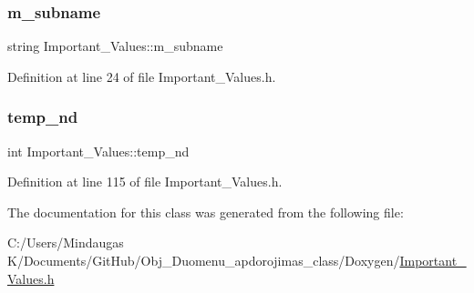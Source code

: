 \subsubsection{\texorpdfstring{m\_subname}{m\_subname}}
{\footnotesize\ttfamily string Important\+\_\+\+Values\+::m\+\_\+subname\hspace{0.3cm}{\ttfamily [private]}}



Definition at line 24 of file Important\+\_\+\+Values.\+h.

\mbox{\label{class_important___values_a4e17c683a365a14fdbc847be3b4e5cb7}} 
\subsubsection{\texorpdfstring{temp\_nd}{temp\_nd}}
{\footnotesize\ttfamily int Important\+\_\+\+Values\+::temp\+\_\+nd}



Definition at line 115 of file Important\+\_\+\+Values.\+h.



The documentation for this class was generated from the following file\+:\begin{DoxyCompactItemize}
\item 
C\+:/\+Users/\+Mindaugas K/\+Documents/\+Git\+Hub/\+Obj\+\_\+\+Duomenu\+\_\+apdorojimas\+\_\+class/\+Doxygen/\mbox{\hyperlink{_important___values_8h}{Important\+\_\+\+Values.\+h}}\end{DoxyCompactItemize}
